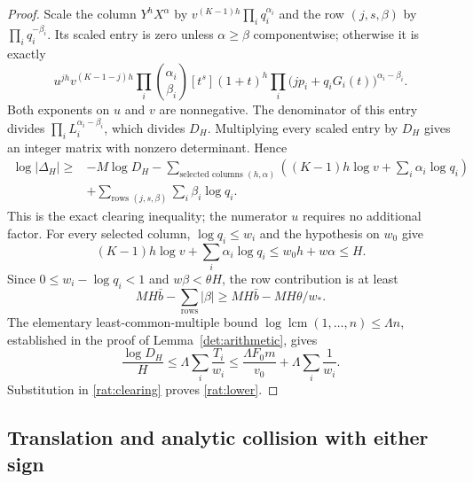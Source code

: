 \documentclass[11pt]{article}
\DeclareMathOperator{\lcm}{lcm}
\theoremstyle{definition}
\theoremstyle{remark}
\numberwithin{equation}{section}
\begin{document}
\begin{proof}
Scale the column $Y^hX^\alpha$ by
$v^{(K-1)h}\prod_iq_i^{\alpha_i}$ and the row $(j,s,\beta)$ by
$\prod_iq_i^{-\beta_i}$.  Its scaled entry is zero unless
$\alpha\ge\beta$ componentwise; otherwise it is exactly
\begin{equation}
 u^{jh}v^{(K-1-j)h}\prod_i\binom{\alpha_i}{\beta_i}
 [t^s](1+t)^h
 \prod_i\bigl(jp_i+q_iG_i(t)\bigr)^{\alpha_i-\beta_i}.
 \label{rat:scaled-entry}
\end{equation}
Both exponents on $u$ and $v$ are nonnegative.  The denominator of
this entry divides $\prod_iL_i^{\alpha_i-\beta_i}$, which divides
$D_H$.  Multiplying every scaled entry by $D_H$ gives an integer
matrix with nonzero determinant.  Hence
\begin{equation}
\begin{aligned}
 \log|\Delta_H|\ge{}&-M\log D_H
 -\sum_{\text{selected columns }(h,\alpha)}
       \left((K-1)h\log v+\sum_i\alpha_i\log q_i\right)\\
 &+\sum_{\text{rows }(j,s,\beta)}\sum_i\beta_i\log q_i.
\end{aligned}
\label{rat:clearing}
\end{equation}
This is the exact clearing inequality; the numerator $u$ requires no
additional factor.
For every selected column, $\log q_i\le w_i$ and the hypothesis on
$w_0$ give
\[
 (K-1)h\log v+\sum_i\alpha_i\log q_i
 \le w_0h+w\alpha\le H.
\]
Since $0\le w_i-\log q_i<1$ and $w\beta<\theta H$, the row contribution
is at least
\[
 MH\bar b-\sum_{\text{rows}}|\beta|
 \ge MH\bar b-MH\theta/w_*.
\]
The elementary least-common-multiple bound
$\log\lcm(1,\ldots,n)\le\Lambda n$, established in the proof of
Lemma~\ref{det:arithmetic}, gives
\[
 \frac{\log D_H}{H}
 \le\Lambda\sum_i\frac{T_i}{w_i}
 \le\frac{\Lambda F_0m}{v_0}+\Lambda\sum_i\frac1{w_i}.
\]
Substitution in \eqref{rat:clearing} proves \eqref{rat:lower}.
\end{proof}

\subsection{Translation and analytic collision with either sign}
\end{document}
